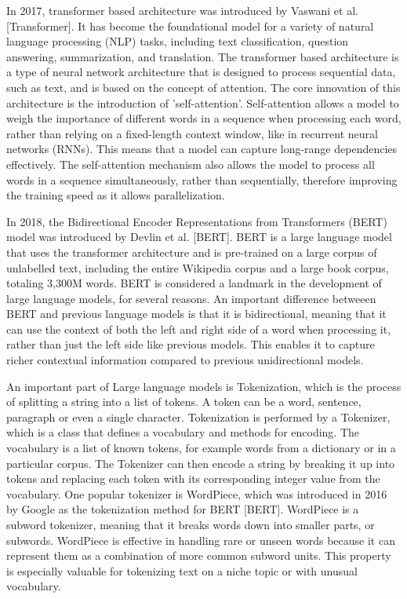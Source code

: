 \documentclass{UoYCSproject}
\begin{document}
In 2017, transformer based architecture was introduced by Vaswani et al. [Transformer].
It has become the foundational model for a variety of natural language processing (NLP) tasks, including text classification, question answering, summarization, and translation.
The transformer based architecture is a type of neural network architecture that is designed to process sequential data, such as text, and is based on the concept of attention.
The core innovation of this architecture is the introduction of 'self-attention'.
Self-attention allows a model to weigh the importance of different words in a sequence when processing each word, rather than relying on a fixed-length context window, like in recurrent neural networks (RNNs).
This means that a model can capture long-range dependencies effectively.
The self-attention mechanism also allows the model to process all words in a sequence simultaneously, rather than sequentially, therefore improving the training speed as it allows parallelization.
\par
In 2018, the Bidirectional Encoder Representations from Transformers (BERT) model was introduced by Devlin et al.
[BERT]. BERT is a large language model that uses the transformer architecture and is pre-trained on a large corpus of
unlabelled
text, including the entire Wikipedia corpus and a large book corpus, totaling 3,300M words.
BERT is considered a landmark in the development of large language models, for several reasons.
An important difference betweeen BERT and previous language models is that it is bidirectional, meaning that it can
use the context of both the left and right side of a word when processing it, rather than just the left side like
previous models.
This enables it to capture richer contextual information compared to previous unidirectional models.


An important part of Large language models is Tokenization, which is the process of splitting a string into a list of
tokens.
A token can be a word, sentence, paragraph or even a single character.
Tokenization is performed by a Tokenizer, which is a class that defines a vocabulary and methods for encoding.
The vocabulary is a list of known tokens, for example words from a dictionary or in a particular corpus.
The Tokenizer can then encode a string by breaking it up into tokens and replacing each token with its corresponding integer value from the vocabulary.
One popular tokenizer is WordPiece, which was introduced in 2016 by Google as the tokenization method for BERT [BERT].
WordPiece is a subword tokenizer, meaning that it breaks words down into smaller parts, or subwords.
WordPiece is effective in handling rare or unseen words because it can represent them as a combination of more common subword units.
This property is especially valuable for tokenizing text on a niche topic or with unusual vocabulary. \par
\end{document}
